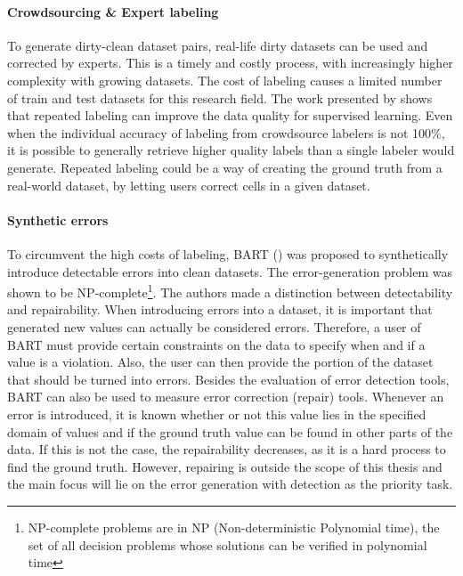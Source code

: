 \paragraph{Crowdsourcing \& Expert labeling}
To generate dirty-clean dataset pairs, real-life dirty datasets can be used and corrected by experts. This is a timely and costly process, with increasingly higher complexity with growing datasets. The cost of labeling causes a limited number of train and test datasets for this research field.
The work presented by \cite{Sheng2008-gk} shows that repeated labeling can improve the data quality for supervised learning. Even when the individual accuracy of labeling from crowdsource labelers is not 100\%, it is possible to generally retrieve higher quality labels than a single labeler would generate. Repeated labeling could be a way of creating the ground truth from a real-world dataset, by letting users correct cells in a given dataset.

\paragraph{Synthetic errors} To circumvent the high costs of labeling, BART (\cite{Arocena2015-om}) was proposed to synthetically introduce detectable errors into clean datasets. The error-generation problem was shown to be NP-complete\footnote{NP-complete problems are in NP (Non-deterministic Polynomial time), the set of all decision problems whose solutions can be verified in polynomial time}. The authors made a distinction between detectability and repairability. When introducing errors into a dataset, it is important that generated new values can actually be considered errors. Therefore, a user of BART must provide certain constraints on the data to specify when and if a value is a violation. Also, the user can then provide the portion of the dataset that should be turned into errors. 
Besides the evaluation of error detection tools, BART can also be used to measure error correction (repair) tools. Whenever an error is introduced, it is known whether or not this value lies in the specified domain of values and if the ground truth value can be found in other parts of the data. If this is not the case, the repairability decreases, as it is a hard process to find the ground truth. However, repairing is outside the scope of this thesis and the main focus will lie on the error generation with detection as the priority task. 